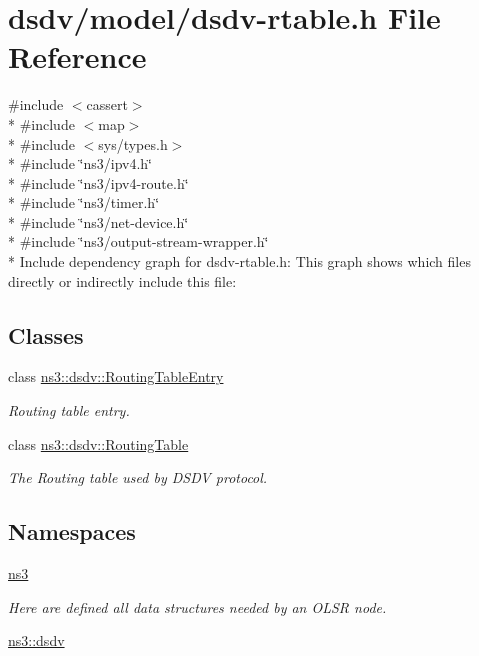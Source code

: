 \hypertarget{dsdv-rtable_8h}{}\section{dsdv/model/dsdv-\/rtable.h File Reference}
\label{dsdv-rtable_8h}
{\ttfamily \#include $<$cassert$>$}\\*
{\ttfamily \#include $<$map$>$}\\*
{\ttfamily \#include $<$sys/types.\+h$>$}\\*
{\ttfamily \#include \char`\"{}ns3/ipv4.\+h\char`\"{}}\\*
{\ttfamily \#include \char`\"{}ns3/ipv4-\/route.\+h\char`\"{}}\\*
{\ttfamily \#include \char`\"{}ns3/timer.\+h\char`\"{}}\\*
{\ttfamily \#include \char`\"{}ns3/net-\/device.\+h\char`\"{}}\\*
{\ttfamily \#include \char`\"{}ns3/output-\/stream-\/wrapper.\+h\char`\"{}}\\*
Include dependency graph for dsdv-\/rtable.h\+:
This graph shows which files directly or indirectly include this file\+:
\subsection*{Classes}
\begin{DoxyCompactItemize}
\item 
class \hyperlink{classns3_1_1dsdv_1_1RoutingTableEntry}{ns3\+::dsdv\+::\+Routing\+Table\+Entry}
\begin{DoxyCompactList}\small\item\em Routing table entry. \end{DoxyCompactList}\item 
class \hyperlink{classns3_1_1dsdv_1_1RoutingTable}{ns3\+::dsdv\+::\+Routing\+Table}
\begin{DoxyCompactList}\small\item\em The Routing table used by D\+S\+DV protocol. \end{DoxyCompactList}\end{DoxyCompactItemize}
\subsection*{Namespaces}
\begin{DoxyCompactItemize}
\item 
 \hyperlink{namespacens3}{ns3}
\begin{DoxyCompactList}\small\item\em Here are defined all data structures needed by an O\+L\+SR node. \end{DoxyCompactList}\item 
 \hyperlink{namespacens3_1_1dsdv}{ns3\+::dsdv}
\end{DoxyCompactItemize}
